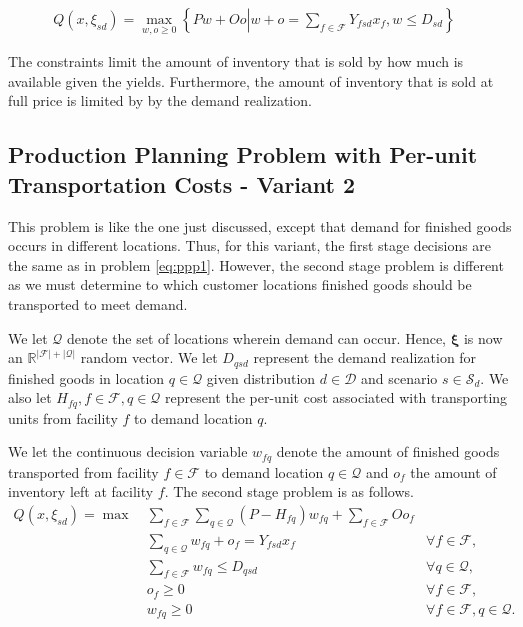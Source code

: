 \documentclass[12pt]{article}
\theoremstyle{thmstylethree}%
\newcommand{\mtc}[1] {\mathcal{#1}}
\newcommand{\rv}[1]{\ensuremath{\bm{#1}}}
\def\R{\ensuremath{\mathbb{R}}}
\begin{document}
\begin{align}    \label{eq:ppp1:sp}
Q(x,\xi_{sd}) = \max_{w, o \geq 0}\left\{P w+Oo\left\vert w + o= \sum_{f\in\mathcal{F}}Y_{fsd}x_{f}, w\leq D_{sd}\right.\right\}&
\end{align}


The constraints limit the amount of inventory that is sold by how much is available given the yields. Furthermore, the amount of inventory that is sold at full price is limited by by the demand realization. 


\subsection{Production Planning Problem with Per-unit Transportation Costs - Variant 2}
\label{subsec:pp_pu_trans_costs}
This problem is like the one just discussed, except that demand for finished goods occurs in different locations. 
Thus, for this variant, the first stage decisions are the same as in problem \eqref{eq:ppp1}. However, the second stage problem is different as we must determine to which customer locations finished goods should be transported to meet demand. 

We let $\mtc{Q}$ denote the set of locations wherein demand can occur. 
Hence, $\rv{\xi}$ is now an $\R^{|\mtc{F}|+|\mtc{Q}|}$ random vector.
We let $D_{qsd}$ represent the demand realization for finished goods in location $q \in \mtc{Q}$ given distribution $d \in \mtc{D}$ and scenario $s \in \mtc{S}_{d}$. We also let $H_{fq}, f \in \mtc{F}, q \in \mtc{Q}$ represent the per-unit cost associated with transporting units from facility $f$ to demand location $q.$ 

We let the continuous decision variable $w_{fq}$ denote the amount of finished goods transported from facility $f \in \mtc{F}$ to demand location $q \in \mtc{Q}$ and $o_f$ the amount of inventory left at facility $f$. The second stage problem is as follows.
\begin{subequations}
    \label{eq:ppp2:sp}
\begin{align}
Q(x,\xi_{sd})=\max~&\sum_{f\in\mathcal{F}}\sum_{q\in\mtc{Q}}(P-H_{fq})w_{fq}+\sum_{f\in\mathcal{F}}Oo_{f}\\
\label{eq:ppp2:c5}  &\sum_{q\in\mtc{Q}}w_{fq}+o_{f}= Y_{fsd}x_{f} & \forall f\in\mathcal{F},\\
\label{eq:ppp2:c6}  &\sum_{f\in\mathcal{F}}w_{fq}\leq D_{qsd}&\forall  q\in\mtc{Q},\\
\label{eq:ppp2:r1} &  o_{f} \geq 0 & \forall f\in\mathcal{F}, \\
\label{eq:ppp2:r2} & w_{fq} \geq 0 & \forall f \in \mathcal{F},q\in\mtc{Q}.
\end{align}
\end{subequations}
\end{document}
